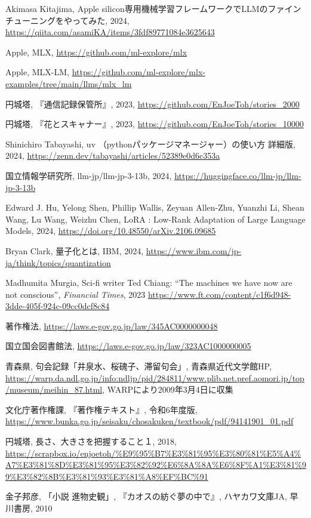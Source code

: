 \documentclass[10pt, a5paper, twoside]{jsarticle}
\theoremstyle{definition}
\begin{document}
	\begin{thebibliography}{99}

		 Akimasa Kitajima, Apple silicon専用機械学習フレームワークでLLMのファインチューニングをやってみた, 2024, \url{https://qiita.com/asamiKA/items/3fdf89771084e3625643}

		 Apple, MLX, \url{https://github.com/ml-explore/mlx}

		 Apple, MLX-LM, \url{https://github.com/ml-explore/mlx-examples/tree/main/llms/mlx_lm}

		 円城塔, 『通信記録保管所』, 2023, \url{https://github.com/EnJoeToh/stories_2000}

		 円城塔, 『花とスキャナー』, 2023, \url{https://github.com/EnJoeToh/stories_10000}

		 Shinichiro Tabayashi, uv （pythonパッケージマネージャー）の使い方 詳細版, 2024, \url{https://zenn.dev/tabayashi/articles/52389e0d6c353a}

		 国立情報学研究所, llm-jp/llm-jp-3-13b, 2024, \url{https://huggingface.co/llm-jp/llm-jp-3-13b}

		 Edward J. Hu, Yelong Shen, Phillip Wallis, Zeyuan Allen-Zhu, Yuanzhi Li, Shean Wang, Lu Wang, Weizhu Chen, LoRA : Low-Rank Adaptation of Large Language Models, 2024, \url{https://doi.org/10.48550/arXiv.2106.09685}

		 Bryan Clark, 量子化とは, IBM, 2024, \url{https://www.ibm.com/jp-ja/think/topics/quantization}

		 Madhumita Murgia, Sci-fi writer Ted Chiang: ``The machines we have now are not conscious'', \textit{Financial Times}, 2023 \url{https://www.ft.com/content/c1f6d948-3dde-405f-924c-09cc0dcf8c84}

		 著作権法, \url{https://laws.e-gov.go.jp/law/345AC0000000048}

		 国立国会図書館法, \url{https://laws.e-gov.go.jp/law/323AC1000000005}

		 青森県, 句会記録「井泉水、桜磈子、滞留句会」, 青森県近代文学館HP, \url{https://warp.da.ndl.go.jp/info:ndljp/pid/284811/www.plib.net.pref.aomori.jp/top/museum/meihin_87.html}, WARPにより2009年3月4日に収集

		 文化庁著作権課, 『著作権テキスト』, 令和6年度版, \url{https://www.bunka.go.jp/seisaku/chosakuken/textbook/pdf/94141901_01.pdf}

		 円城塔, 長さ、大きさを把握すること１, 2018, \url{https://scrapbox.io/enjoetoh/%E9%95%B7%E3%81%95%E3%80%81%E5%A4%A7%E3%81%8D%E3%81%95%E3%82%92%E6%8A%8A%E6%8F%A1%E3%81%99%E3%82%8B%E3%81%93%E3%81%A8%EF%BC%91}

		 金子邦彦, 「小説 進物史観」, 『カオスの紡ぐ夢の中で』, ハヤカワ文庫JA, 早川書房, 2010

	\end{thebibliography}
\end{document}
